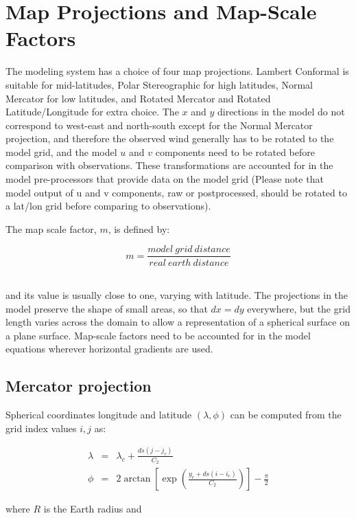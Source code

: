 \section{Map Projections and Map-Scale Factors}
The modeling system has a
choice of four map projections. Lambert Conformal is suitable for mid-latitudes,
Polar Stereographic for high latitudes, Normal Mercator for low latitudes, and
Rotated Mercator and Rotated Latitude/Longitude for extra choice.
The $x$ and $y$ directions in the model do
not correspond to west-east and north-south except for the Normal Mercator
projection, and therefore the observed wind generally has to be rotated to the
model grid, and the model $u$ and $v$ components need to be rotated before
comparison with observations. These transformations are accounted for in the
model pre-processors that provide data on the model grid (Please note that
model output of u and v components, raw or postprocessed, should be rotated to a
lat/lon grid before comparing to observations).

The map scale factor, $m$, is defined by:

\begin{equation}
  m = \frac{model\:grid\:distance}{real\:earth\:distance}
\end{equation}

\noindent \\ and its value is usually close to one, varying with latitude. The
projections in the model preserve the shape of small areas, so that $dx=dy$
everywhere, but the grid length varies across the domain to allow a
representation of a spherical surface on a plane surface.
Map-scale factors need to be accounted for in the model equations wherever
horizontal gradients are used.

\subsection{Mercator projection}

Spherical coordinates longitude and latitude $(\lambda, \phi)$ can be computed
from the grid index values $i,j$ as:

\begin{eqnarray}
  \lambda &=& \lambda_c + \frac{ds \left(j-j_c\right)}{C_2} \\
  \phi &=& 2 \arctan\left[\exp\left(\frac{y_c + 
         ds\left(i-i_c\right)}{C_2}\right)\right]-\frac{\pi}{2}
\end{eqnarray}

where $R$ is the Earth radius and

